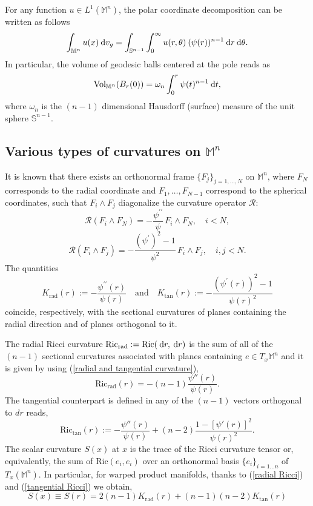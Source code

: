 \documentclass[a4paper,11pt,reqno]{amsart}
\renewcommand\eqref[1]{(\ref{#1})}
\theoremstyle{plain}
\numberwithin{equation}{section} \allowdisplaybreaks
\newcommand{\dvg}{\: {\rm d}v_{g}}
\newcommand{\m}{\mathbb{M}^n}
\newcommand{\dt}{\:{\rm d}t}
\newcommand{\dr}{\:{\rm d}r}
\newcommand{\dsn}{\:{\rm d}\theta}
\newcommand{\sn}{\mathbb{S}^{n-1}}
\newcommand{\uv}{\omega_n}
\begin{document}
For any function $u\in L^1(\m)$, the polar coordinate decomposition can be written as follows
\begin{align*}
\int_{\m}u(x)\dvg=\int_{\sn}\int_{0}^{\infty}u(r,\theta)\:(\psi(r))^{n-1}\dr\dsn.
\end{align*}
In particular, the volume of geodesic balls centered at the pole reads as
\begin{equation}\label{ball volume}
    \text{Vol}_{\m}(B_r(0))=\uv\int_{0}^r\psi(t)^{n-1}\dt,
\end{equation}
where $\uv$ is the $(n-1)$ dimensional Hausdorff (surface) measure of the unit sphere $\sn$.






\subsection{Various types of curvatures on \texorpdfstring{$\m$}{M}}
It is known that there exists an orthonormal frame $\{F_{j}\}_{j = 1, \ldots, N}$ on $\m$, where $F_{N}$ corresponds to the radial coordinate and $F_{1}, \ldots, F_{N-1}$ correspond to the spherical coordinates, such that $F_{i} \wedge F_{j}$ diagonalize the curvature operator $\mathcal{R}$:  
\[
	\mathcal{R}(F_{i} \wedge F_{N}) = - \frac{\psi^{\prime \prime}}{\psi} \, F_{i} \wedge F_{N}, \quad i < N,
\]
\[
	\mathcal{R}(F_{i} \wedge F_{j}) = - \frac{(\psi^{\prime})^2 - 1}{\psi^2} \, F_{i} \wedge F_{j}, \quad i,j < N.
\]
The quantities
\begin{equation}\label{radial and tangential curvature}
		K_{\text{rad}}(r) := - \frac{\psi^{\prime \prime}(r)}{\psi(r)} \quad \text{and} \quad K_{\text{tan}}(r) := - \frac{(\psi^{\prime}(r))^2 - 1}{\psi(r)^{2}}
\end{equation}
coincide, respectively, with the sectional curvatures of planes containing the radial direction and of planes orthogonal to it.

The radial Ricci curvature $\mathrm{Ric}_{\text{rad}}:= \mathrm{Ric}(\dr, \dr)$ is the sum of all of the
$(n-1)$ sectional curvatures associated with planes containing $e\in T_x\m$ and it is given by using \eqref{radial and tangential curvature},
\begin{equation}\label{radial Ricci}
    \mathrm{Ric}_{\text{rad}}(r)=-(n-1)\frac{\psi''(r)}{\psi(r)}.
\end{equation}
The tangential counterpart is defined in any of the $(n-1)$ vectors orthogonal to $dr$ reads,
\begin{equation}\label{tangential Ricci}
    \mathrm{Ric}_{\text{tan}}(r):=-\frac{\psi''(r)}{\psi(r)}+(n-2)\frac{1-[\psi'(r)]^2}{\psi(r)^2}.
\end{equation}
The scalar curvature $S(x)$ at $x$ is the trace of the Ricci curvature tensor or, equivalently, the sum of
$\text{Ric}(e_i, e_i)$ over an orthonormal basis $\{e_i\}_{i=1...n}$ of $T_x(\m)$. In particular, for warped product manifolds, thanks to \eqref{radial Ricci} and \eqref{tangential Ricci} we obtain,
\begin{equation}\label{scalar curvature}
    S(x)\equiv S(r)=2(n-1)K_{\mathrm{rad}}(r)+(n-1)(n-2)K_{\mathrm{tan}}(r)
\end{equation}
\end{document}
